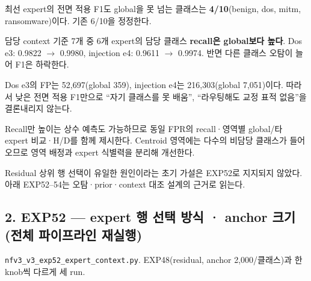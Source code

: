 \par\noindent \textbullet\enspace 최선 expert의 전면 적용 F1도 global을 못 넘는 클래스는 \textbf{4/\allowbreak{}10}(benign, dos, mitm, ransomware)이다. 기존 6/\allowbreak{}10을 정정한다.


\par\noindent \textbullet\enspace 담당 context 기준 7개 중 6개 expert의 담당 클래스 \textbf{recall은 global보다 높다}. Dos e3: 0.9822 \ensuremath{\rightarrow} 0.9980, injection e4: 0.9611 \ensuremath{\rightarrow} 0.9974. 반면 다른 클래스 오탐이 늘어 F1은 하락한다.


\par\noindent \textbullet\enspace Dos e3의 FP는 52,697(global 359), injection e4는 216,303(global 7,051)이다. 따라서 낮은 전면 적용 F1만으로 “자기 클래스를 못 배움”, “라우팅해도 교정 표적 없음”을 결론내리지 않는다.


\par\noindent \textbullet\enspace Recall만 높이는 상수 예측도 가능하므로 동일 FPR의 recall·영역별 global/\allowbreak{}타 expert 비교·H/\allowbreak{}D를 함께 제시한다. Centroid 영역에는 다수의 비담당 클래스가 들어오므로 영역 배정과 expert 식별력을 분리해 개선한다.


\par\noindent \textbullet\enspace Residual 상위 행 선택이 유일한 원인이라는 초기 가설은 EXP52로 지지되지 않았다. 아래 EXP52–54는 오탐·prior·context 대조 설계의 근거로 읽는다.


\subsection{2. EXP52 — expert 행 선택 방식 · anchor 크기 (전체 파이프라인 재실행)}
\texttt{nfv3\_\allowbreak{}\allowbreak{}v3\_\allowbreak{}\allowbreak{}exp52\_\allowbreak{}\allowbreak{}ex\allowbreak{}pert\_\allowbreak{}\allowbreak{}con\allowbreak{}text.\allowbreak{}py}. EXP48(residual, anchor 2,000/\allowbreak{}클래스)과 한 knob씩 다르게 세 run.

